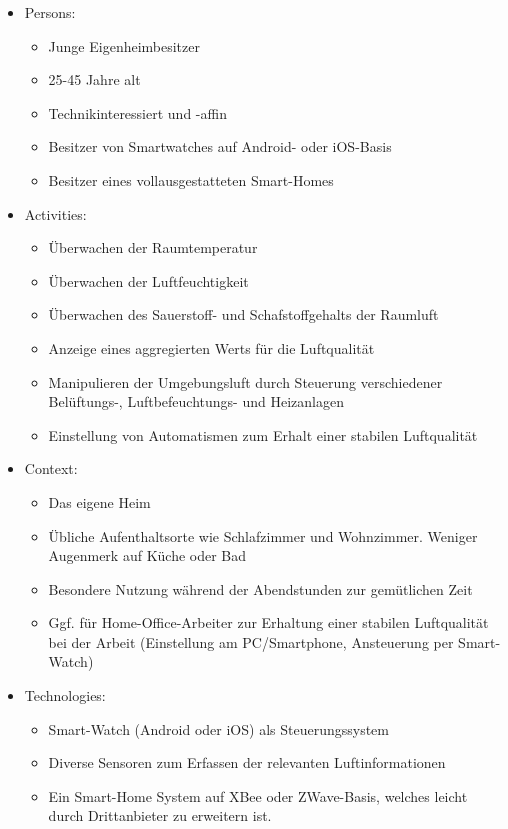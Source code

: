 \documentclass[a4paper,10pt]{article}
\begin{document}
\begin{itemize}
    \item Persons: 
        \begin{itemize}
            \item Junge Eigenheimbesitzer
            \item 25-45 Jahre alt
            \item Technikinteressiert und -affin
            \item Besitzer von Smartwatches auf Android- oder iOS-Basis
            \item Besitzer eines vollausgestatteten Smart-Homes
        \end{itemize}
    \item Activities:
        \begin{itemize}
            \item Überwachen der Raumtemperatur
            \item Überwachen der Luftfeuchtigkeit
            \item Überwachen des Sauerstoff- und Schafstoffgehalts der Raumluft
            \item Anzeige eines aggregierten Werts für die Luftqualität
            \item Manipulieren der Umgebungsluft durch Steuerung verschiedener Belüftungs-, Luftbefeuchtungs- und Heizanlagen
            \item Einstellung von Automatismen zum Erhalt einer stabilen Luftqualität
        \end{itemize}
    \item Context:
        \begin{itemize}
            \item Das eigene Heim
            \item Übliche Aufenthaltsorte wie Schlafzimmer und Wohnzimmer. Weniger Augenmerk auf Küche oder Bad
            \item Besondere Nutzung während der Abendstunden zur gemütlichen Zeit
            \item Ggf. für Home-Office-Arbeiter zur Erhaltung einer stabilen Luftqualität bei der Arbeit (Einstellung am PC/Smartphone, Ansteuerung per Smart-Watch)
        \end{itemize}
    \item Technologies:
        \begin{itemize}
            \item Smart-Watch (Android oder iOS) als Steuerungssystem
            \item Diverse Sensoren zum Erfassen der relevanten Luftinformationen
            \item Ein Smart-Home System auf XBee oder ZWave-Basis, welches leicht durch Drittanbieter zu erweitern ist.
        \end{itemize}
\end{itemize}
\end{document}
